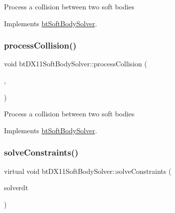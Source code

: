 Process a collision between two soft bodies 

Implements \hyperlink{classbtSoftBodySolver_a08f03a574f0936d834ff100f87755ea6}{bt\+Soft\+Body\+Solver}.

\mbox{\label{classbtDX11SoftBodySolver_a74adb4cab44b9058b9d67b7b8116d30e}} 
\subsubsection{\texorpdfstring{process\+Collision()}{processCollision()}\hspace{0.1cm}{\footnotesize\ttfamily [2/2]}}
{\footnotesize\ttfamily void bt\+D\+X11\+Soft\+Body\+Solver\+::process\+Collision (\begin{DoxyParamCaption}\item[{\hyperlink{classbtSoftBody}{bt\+Soft\+Body} $\ast$}]{,  }\item[{\hyperlink{classbtSoftBody}{bt\+Soft\+Body} $\ast$}]{ }\end{DoxyParamCaption})\hspace{0.3cm}{\ttfamily [virtual]}}

Process a collision between two soft bodies 

Implements \hyperlink{classbtSoftBodySolver_a08f03a574f0936d834ff100f87755ea6}{bt\+Soft\+Body\+Solver}.

\mbox{\label{classbtDX11SoftBodySolver_a4394232848404499b2a77fdf10336496}} 
\subsubsection{\texorpdfstring{solve\+Constraints()}{solveConstraints()}\hspace{0.1cm}{\footnotesize\ttfamily [1/2]}}
{\footnotesize\ttfamily virtual void bt\+D\+X11\+Soft\+Body\+Solver\+::solve\+Constraints (\begin{DoxyParamCaption}\item[{float}]{solverdt }\end{DoxyParamCaption})\hspace{0.3cm}{\ttfamily [virtual]}}

